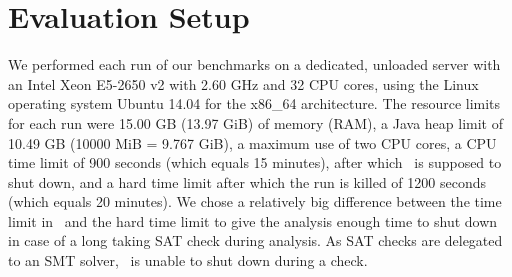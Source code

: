 \section{Evaluation Setup}
We performed each run of our benchmarks on a dedicated, unloaded server with an Intel Xeon E5-2650 v2 with 2.60 GHz and 32 CPU cores, using the Linux operating system Ubuntu 14.04 for the x86\_64 architecture.
The resource limits for each run were 15.00 GB (13.97 GiB) of memory (RAM), a Java heap limit of 10.49 GB (10000 MiB = 9.767 GiB),
a maximum use of two CPU cores,
a CPU time limit of 900 seconds (which equals 15 minutes), after which \cpaChecker\ is supposed to shut down,
and a hard time limit after which the run is killed of 1200 seconds (which equals 20 minutes).
We chose a relatively big difference between the time limit in \cpaChecker\ and the hard time limit to give the analysis enough time to shut down in case of a long taking SAT check during analysis.
As SAT checks are delegated to an SMT solver, \cpaChecker\ is unable to shut down during a check.

